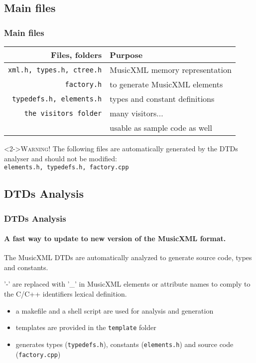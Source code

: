 \documentclass{beamer}
\begin{document}
\subsection{Main files}
\begin{frame}
	\frametitle{Main files}

	{\small 
	\begin{center}
	\begin{tabular}{|r|l|}
	\hline
	\textbf{Files, folders} & \textbf{Purpose} \\ 
	\hline
	\texttt{xml.h, types.h, ctree.h} & MusicXML memory representation \\ 
	\hline
	\texttt{factory.h} & to generate MusicXML elements \\
	\hline
	\texttt{typedefs.h, elements.h} & types and constant definitions \\
	\hline
	\texttt{the visitors folder} & many visitors... \\
	  & usable as sample code as well \\
	\hline
	\end{tabular}
	\end{center}
	}

\begin{block}<2->{\alert{\textsc{Warning!}}}
The following files are automatically generated by the DTDs analyser and should not be modified:\\
\hspace{15mm} \texttt{elements.h, typedefs.h, factory.cpp} \\
\end{block}
\end{frame}


\subsection{DTDs Analysis}
\begin{frame}
	\frametitle{DTDs Analysis}
	\framesubtitle{A fast way to update to new version of the MusicXML format.}

	The MusicXML DTDs are automatically analyzed to generate source code, types and constants. 
\begin{block}{}
'-' are replaced with '\_' in MusicXML elements or attribute names to comply to the C/C++ 
identifiers lexical definition.
\end{block}

	\begin{itemize}
	\item a makefile and a shell script are used for analysis and generation
	\item templates are provided in the \texttt{template} folder
	\item generates types (\texttt{typedefs.h}), constants  (\texttt{elements.h}) 
	and source code (\texttt{factory.cpp})
	\end{itemize}

 

\end{frame}
\end{document}
